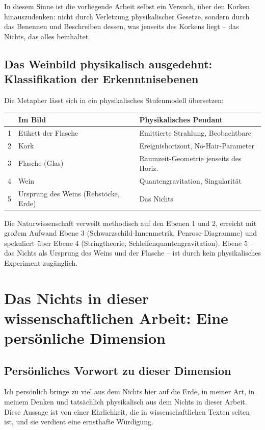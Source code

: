 ﻿\documentclass[12pt,a4paper]{report}
\begin{document}
In diesem Sinne ist die vorliegende Arbeit selbst ein Versuch, über den Korken hinauszudenken: nicht durch Verletzung physikalischer Gesetze, sondern durch das Benennen und Beschreiben dessen, was jenseits des Korkens liegt -- das Nichts, das alles beinhaltet.

\subsection{Das Weinbild physikalisch ausgedehnt: Klassifikation der Erkenntnisebenen}

Die Metapher lässt sich in ein physikalisches Stufenmodell übersetzen:

\begin{center}
\begin{tabular}{lll}
	\hline
	\textbf{} & \textbf{Im Bild} & \textbf{Physikalisches Pendant} \\
	\hline
	1 & Etikett der Flasche & Emittierte Strahlung, Beobachtbare \\
	2 & Kork & Ereignishorizont, No-Hair-Parameter \\
	3 & Flasche (Glas) & Raumzeit-Geometrie jenseits des Horiz. \\
	4 & Wein & Quantengravitation, Singularität \\
	5 & Ursprung des Weins (Rebstöcke, Erde) & Das Nichts \\
	\hline
\end{tabular}
\end{center}

Die Naturwissenschaft verweilt methodisch auf den Ebenen 1 und 2, erreicht mit großem Aufwand Ebene 3 (Schwarzschild-Innenmetrik, Penrose-Diagramme) und spekuliert über Ebene 4 (Stringtheorie, Schleifenquantengravitation). Ebene 5 -- das Nichts als Ursprung des Weins und der Flasche -- ist durch kein physikalisches Experiment zugänglich.

\section{Das Nichts in dieser wissenschaftlichen Arbeit: Eine persönliche Dimension}

\subsection{Persönliches Vorwort zu dieser Dimension}

Ich persönlich bringe zu viel aus dem Nichts hier auf die Erde, in meiner Art, in meinem Denken und tatsächlich physikalisch aus dem Nichts in dieser Arbeit. Diese Aussage ist von einer Ehrlichkeit, die in wissenschaftlichen Texten selten ist, und sie verdient eine ernsthafte Würdigung.
\end{document}
